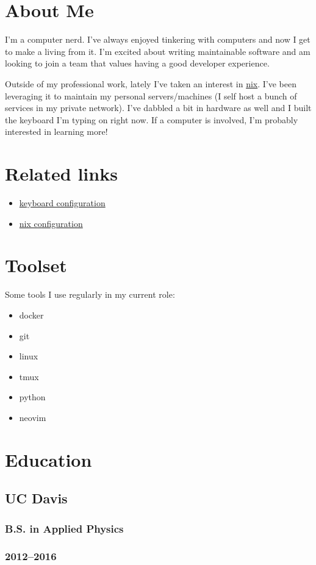 \documentclass{article}
\begin{document}
\begin{minipage}[t]{.3\textwidth}
	\section*{About Me}
	I'm a computer nerd. I've always enjoyed tinkering with computers and now I
	get to make a living from it. I'm excited about writing maintainable
	software and am looking to join a team that values having a good developer
	experience.

	Outside of my professional work, lately I've taken an interest in
	\href{https://nixos.org/}{nix}. I've been leveraging it to maintain my
	personal servers/machines (I self host a bunch of services in my private
	network). I've dabbled a bit in hardware as well and I built the keyboard
	I'm typing on right now. If a computer is involved, I'm probably interested
	in learning more!

	\vspace{1em}
	\section*{Related links}
	\begin{itemize}
		\item \href{https://github.com/alejandro-angulo/zmk-config}{keyboard configuration}
		\item \href{https://github.com/alejandro-angulo/dotfiles/}{nix configuration}
	\end{itemize}
	\section*{Toolset}
	Some tools I use regularly in my current role:
	\vspace{-0.6em}
	\begin{itemize}
		\item docker
		\item git
		\item linux
		\item tmux
		\item python
		\item neovim
	\end{itemize}
	\section*{Education}
	\subsection*{UC Davis}
	\subsubsection*{B.S. in Applied Physics}
	\subsubsection*{2012--2016}
\end{minipage}
\end{document}
